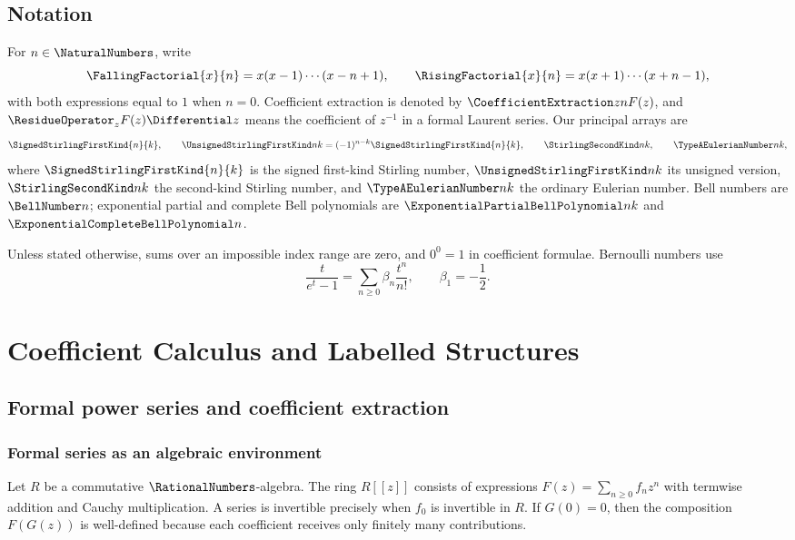 \documentclass[11pt,a4paper,oneside,openany]{book}
\theoremstyle{definition}
\theoremstyle{remark}
\begin{document}
\tableofcontents

\chapter*{Notation}
For $n\in\NaturalNumbers$, write
\[
 \FallingFactorial{x}{n}=x(x-1)\cdots(x-n+1),\qquad
 \RisingFactorial{x}{n}=x(x+1)\cdots(x+n-1),
\]
with both expressions equal to $1$ when $n=0$.  Coefficient extraction is denoted by
$\CoefficientExtraction z n F(z)$, and $\ResidueOperator_z F(z)\Differential z$ means the coefficient of $z^{-1}$ in a
formal Laurent series.  Our principal arrays are
\[
 \SignedStirlingFirstKind{n}{k},\qquad \UnsignedStirlingFirstKind nk=(-1)^{n-k}\SignedStirlingFirstKind{n}{k},\qquad
 \StirlingSecondKind nk,\qquad \TypeAEulerianNumber nk,
\]
where $\SignedStirlingFirstKind{n}{k}$ is the signed first-kind Stirling number, $\UnsignedStirlingFirstKind nk$ its unsigned
version, $\StirlingSecondKind nk$ the second-kind Stirling number, and $\TypeAEulerianNumber nk$ the
ordinary Eulerian number.  Bell numbers are $\BellNumber n$; exponential partial and
complete Bell polynomials are $\ExponentialPartialBellPolynomial nk$ and $\ExponentialCompleteBellPolynomial n$.

Unless stated otherwise, sums over an impossible index range are zero, and
$0^0=1$ in coefficient formulae.  Bernoulli numbers use
\[
 \frac{t}{e^t-1}=\sum_{n\ge0}\beta_n\frac{t^n}{n!},
 \qquad \beta_1=-\frac12.
\]

\mainmatter

\part{Coefficient Calculus and Labelled Structures}

\chapter{Formal power series and coefficient extraction}
\label{ch:formal}

\section{Formal series as an algebraic environment}
Let $R$ be a commutative $\RationalNumbers$-algebra.  The ring $R[[z]]$ consists of expressions
$F(z)=\sum_{n\ge0}f_nz^n$ with termwise addition and Cauchy multiplication.  A series
is invertible precisely when $f_0$ is invertible in $R$.  If $G(0)=0$, then the
composition $F(G(z))$ is well-defined because each coefficient receives only
finitely many contributions.
\end{document}
